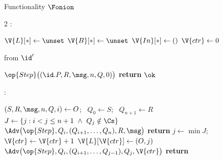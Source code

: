 \begin{interface}[nofloat]{Functionality $\Fonion$ \\
}

{\scriptsize
\setlength{\columnsep}{1.4em}
\begin{multicols}{2}
:
\begin{algorithmic}[1]
\setcounter{contline}{0}\algcont
\State $\V{L}[*] \gets \unset$
\State $\V{B}[*] \gets \unset$
\State $\V{In}[*] \gets ()$
\State $\V{ctr} \gets 0$
\algsave
\end{algorithmic}
\vspace{1.4ex}

 \quad from $\id'$
\begin{algorithmic}[1]
\algcont
{} \label{ln:orlen}
\State $\op{Step}\bigl((\id.P, R, \msg, n, Q, 0)\bigr)$ \label{ln:orstart}
\State \textbf{return} $\ok$
\algsave
\end{algorithmic}
\vspace{1.4ex}

:
\begin{algorithmic}[1]
\algcont
\State $(S, R, \msg, n, Q, i) \gets O$; \ $Q_0 \gets S$; \ $Q_{n+1} \gets R$ \label{ln:orends}
\State $J \gets \{j : i < j \leq n+1 \ \wedge\ Q_j \notin \Cs\}$ \label{ln:ornexthonest}
  \State $\Adv\bigl(\op{Step}, Q_i, (Q_{i+1}, \ldots, Q_n), R, \msg\bigr)$ \label{ln:orallcorrupt}
  \State \textbf{return}
\EndIf
\State $j \gets \min J$; \ $\V{ctr} \gets \V{ctr} + 1$
\State $\V{L}[\V{ctr}] \gets (O, j)$ \label{ln:orlist}
\State $\Adv\bigl(\op{Step}, Q_i, (Q_{i+1}, \ldots, Q_{j-1}), Q_j, \V{ctr}\bigr)$ \label{ln:orsubpath}
\State \textbf{return}
\algsave
\end{algorithmic}
\vspace{1.4ex}


\end{multicols}}
\end{interface}
